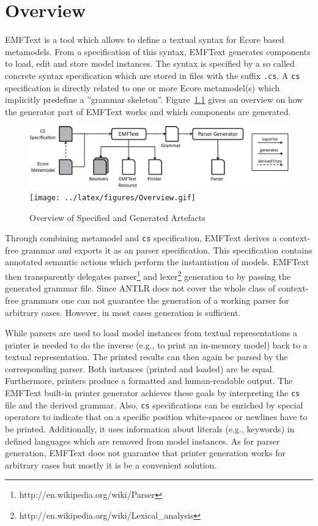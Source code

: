 \chapter{Overview}

EMFText is a tool which allows to define a textual syntax for Ecore based
metamodels. From a specification of this syntax, EMFText generates
components to load, edit and store model instances. The syntax is specified 
by a so called concrete syntax specification which are stored in files with the
suffix \texttt{.cs}. A \texttt{cs} specification is directly related to one or 
more Ecore metamodel(s) which implicitly predefine a ''grammar skeleton''.
Figure~\ref{fig:overview} gives an overview on how the generator part of EMFText
works and which components are generated.

\begin{figure}
\centering
\ifpdf
	\includegraphics[width=1.0\textwidth]{../latex/figures/Overview.pdf}
\else
	\texttt{[image: ../latex/figures/Overview.gif]}
\fi
\caption{Overview of Specified and Generated Artefacts}
\label{fig:overview}
\end{figure}

Through combining metamodel and \texttt{cs} specification, EMFText derives a 
context-free grammar and exports it as an \ANTLR parser specification. This
specification contains annotated semantic actions which perform the
instantiation of models. EMFText then transparently delegates
parser\footnote{http://en.wikipedia.org/wiki/Parser} and 
lexer\footnote{http://en.wikipedia.org/wiki/Lexical\_analysis} generation to
\ANTLR by passing the generated grammar file. Since ANTLR does not cover the
whole class of context-free grammars one can not guarantee the generation of a
working parser for arbitrary cases. However, in most cases generation is
sufficient.

While parsers are used to load model instances from textual representations a 
printer is needed to do the inverse (e.g., to print an in-memory model)
back to a textual representation. The printed results can then 
again be parsed by the corresponding parser. Both instances (printed and
loaded) are be equal. Furthermore, printers produce a formatted and
human-readable output. The EMFText built-in printer generator achieves these
goals by interpreting the \texttt{cs} file and the derived grammar. 
Also, \texttt{cs} specifications can be enriched by 
special operators to indicate that on a specific position white-spaces or newlines 
have to be printed. Additionally, it uses information about literals (e.g.,
keywords) in defined languages which are removed from model instances. As for 
parser generation, EMFText does not guarantee that printer generation works for 
arbitrary cases but mostly it is be a convenient solution.

